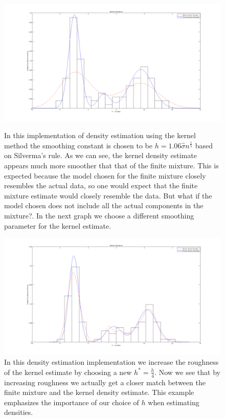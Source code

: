 \documentclass[12pt,a4paper]{article}
\begin{document}
\begin{figure}[ht!] 
\begin{center}
\includegraphics[scale=.2]{inclass7p1_graph1}
\caption{In this implementation of density estimation using the kernel method the smoothing constant is chosen to be $h=1.06\hat{\sigma}n^{\frac{1}{5}}$ based on Silverma's rule. As we can see, the kernel density estimate appears much more smoother that that of the finite mixture. This is expected because the model chosen for the finite mixture closely resembles the actual data, so one would expect that the finite mixture estimate would closely resemble the data. But what if the model chosen does not include all the actual components in the mixture?. In the next graph we choose a different smoothing parameter for the kernel estimate.}
\includegraphics[scale=.2]{inclass7p1_graph2}
\caption{In this density estimation implementation we increase the roughness of the kernel estimate by choosing a new $h^{*}=\frac{h}{4}$. Now we see that by increasing roughness we actually get a closer match between the finite mixture and the kernel density estimate. This example emphasizes the importance of our choice of $h$ when estimating densities.}
\label{inclass fig1}
\end{center}
\end{figure}
\end{document}
